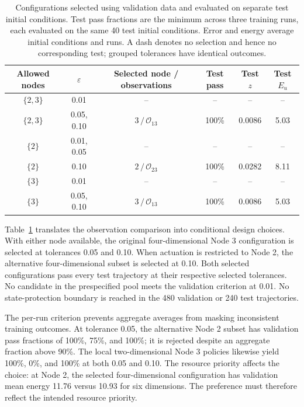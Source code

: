 \begin{table}[pos=!t,width=\textwidth]
\centering
\caption{Configurations selected using validation data and evaluated on separate test initial conditions. Test pass fractions are the minimum across three training runs, each evaluated on the same 40 test initial conditions. Error and energy average initial conditions and runs. A dash denotes no selection and hence no corresponding test; grouped tolerances have identical outcomes.}
\label{tab:configuration_selection}
\small
\begin{tabular}{cccccc}
\toprule
Allowed nodes & $\varepsilon$ & Selected node / observations & Test pass & Test $z$ & Test $E_u$\\
\midrule
$\{2,3\}$ & 0.01 & -- & -- & -- & --\\
$\{2,3\}$ & 0.05, 0.10 & $3\,/\,\mathcal O_{13}$ & 100\% & 0.0086 & 5.03\\
$\{2\}$ & 0.01, 0.05 & -- & -- & -- & --\\
$\{2\}$ & 0.10 & $2\,/\,\mathcal O_{23}$ & 100\% & 0.0282 & 8.11\\
$\{3\}$ & 0.01 & -- & -- & -- & --\\
$\{3\}$ & 0.05, 0.10 & $3\,/\,\mathcal O_{13}$ & 100\% & 0.0086 & 5.03\\
\bottomrule
\end{tabular}
\end{table}

Table~\ref{tab:configuration_selection} translates the observation comparison into conditional design choices. With either node available, the original four-dimensional Node 3 configuration is selected at tolerances 0.05 and 0.10. When actuation is restricted to Node 2, the alternative four-dimensional subset is selected at 0.10. Both selected configurations pass every test trajectory at their respective selected tolerances. No candidate in the prespecified pool meets the validation criterion at 0.01. No state-protection boundary is reached in the 480 validation or 240 test trajectories.

The per-run criterion prevents aggregate averages from masking inconsistent training outcomes. At tolerance 0.05, the alternative Node 2 subset has validation pass fractions of 100\%, 75\%, and 100\%; it is rejected despite an aggregate fraction above 90\%. The local two-dimensional Node 3 policies likewise yield 100\%, 0\%, and 100\% at both 0.05 and 0.10. The resource priority affects the choice: at Node 2, the selected four-dimensional configuration has validation mean energy 11.76 versus 10.93 for six dimensions. The preference must therefore reflect the intended resource priority.

